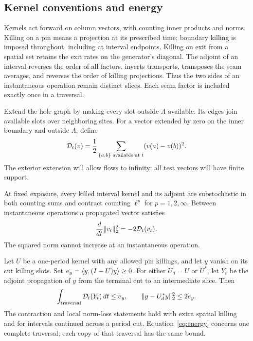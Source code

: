 \subsection{Kernel conventions and energy}

Kernels act forward on column vectors, with counting inner products and
norms.  Killing on a pin means a projection at its prescribed time;
boundary killing is imposed throughout, including at interval endpoints.
Killing on exit from a spatial set retains the exit rates on the
generator's diagonal.  The adjoint of an interval reverses the order of
all factors, inverts transports, transposes the seam averages, and
reverses the order of killing projections.  Thus the two sides of an
instantaneous operation remain distinct slices.  Each seam factor is
included exactly once in a traversal.

Extend the hole graph by making every slot outside $\Lambda$ available.
Its edges join available slots over neighboring sites.  For a vector
extended by zero on the inner boundary and outside $\Lambda$, define
\begin{equation}\label{eq:dirichlet}
 \mathcal D_t(v)=\frac12\sum_{\{a,b\}\text{ available at }t}
                                      (v(a)-v(b))^2.
\end{equation}
The exterior extension will allow flows to infinity; all test vectors
will have finite support.

\begin{lemma}\label{lem:kernelenergy}
At fixed exposure, every killed interval kernel and its adjoint are
substochastic in both counting sums and contract counting $\ell^p$ for
$p=1,2,\infty$.  Between instantaneous operations a propagated vector
satisfies
\[
 \frac{d}{dt}\lVert v_t\rVert_2^2=-2\mathcal D_t(v_t).
\]
The squared norm cannot increase at an instantaneous operation.

Let $U$ be a one-period kernel with any allowed pin killings, and let $y$
vanish on its cut killing slots.  Set
$e_y=\langle y,(I-U)y\rangle\ge0$.  For either $U_d=U$ or $U^*$, let $Y_t$ be
the adjoint propagation of $y$ from the terminal cut to an intermediate
slice.  Then
\begin{equation}\label{eq:energy}
 \int_{\mathrm{traversal}}\mathcal D_t(Y_t)\,dt\le e_y,
 \qquad
 \lVert y-U_d^*y\rVert_2^2\le2e_y.
\end{equation}
The contraction and local norm-loss statements hold with extra spatial
killing and for intervals continued across a period cut.
Equation~\eqref{eq:energy} concerns one complete traversal; each copy
of that traversal has the same bound.
\end{lemma}

